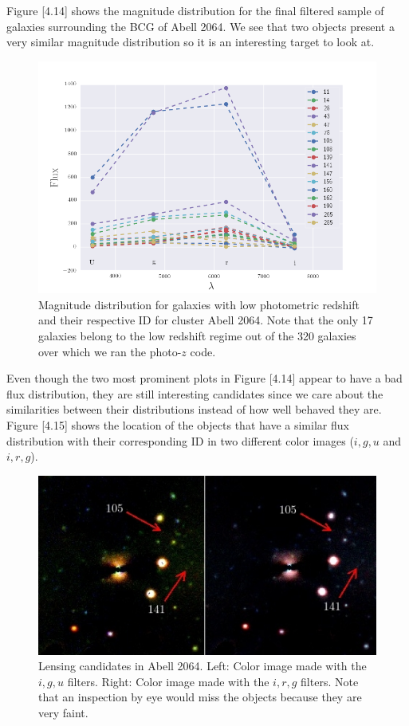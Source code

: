 Figure [4.14] shows the magnitude distribution for the final filtered sample of galaxies surrounding the BCG of Abell 2064. We see that two objects present a very similar magnitude distribution so it is an interesting target to look at. 

\begin{figure}[H]
\centering
\includegraphics[width=15cm]{images/magnitude_distribution_A2064.png}
\caption[Magnitude distribution of galaxies in Abell 2064]{Magnitude distribution for galaxies with low photometric redshift and their respective ID for cluster Abell 2064. Note that the only 17 galaxies belong to the low redshift regime out of the 320 galaxies over which we ran the photo-$z$ code.}
\end{figure}

Even though the two most prominent plots in Figure [4.14] appear to have a bad flux distribution, they are still interesting candidates since we care about the similarities between their distributions instead of how well behaved they are. Figure [4.15] shows the location of the objects that have a similar flux distribution with their corresponding ID in two different color images ($i,g,u$ and $i,r,g$).

\begin{figure}[H]
\centering
\includegraphics[width=15cm]{images/candidates.jpg}
\caption[Lensing candidates Abell 2064]{Lensing candidates in Abell 2064. Left: Color image made with the $i,g,u$ filters. Right: Color image made with the $i,r,g$ filters. Note that an inspection by eye would miss the objects because they are very faint.}
\end{figure}

